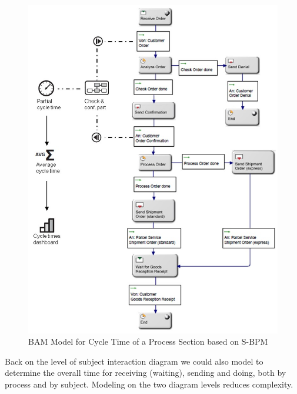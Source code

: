 \begin{figure}[h]
	\centering
	\includegraphics[width=0.9\linewidth]{Figures/Chapter5/Monitoring/BAM-Model-for-Cycle-Time-of-a-Process-Section-based-on-S-BPM.jpg}
	\caption[BAM Model for Cycle Time of a Process Section based on S-BPM]{BAM Model for Cycle Time of a Process Section based on S-BPM}
	\label{fig:BAM-Cycle-Time}
\end{figure}

Back on the level of subject interaction diagram we could also model to determine the overall time for receiving (waiting), sending and doing, both by process and by subject. Modeling on the two diagram levels reduces complexity.

